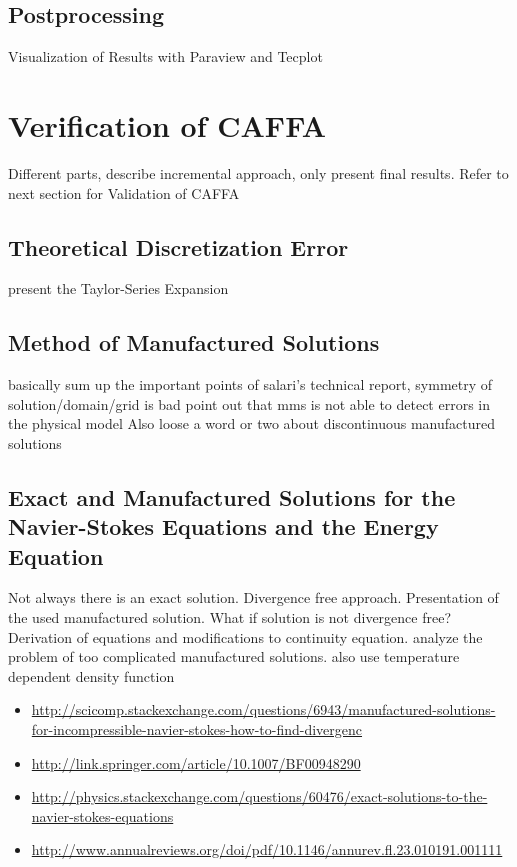 \documentclass[article,type=msc,colorback,accentcolor=tud2a]{tudthesis}
\begin{document}
    \subsection{Postprocessing}
    
      Visualization of Results with Paraview and Tecplot

  \section{Verification of CAFFA}
    
    Different parts, describe incremental approach, only present final results.
    Refer to next section for Validation of CAFFA

    \subsection{Theoretical Discretization Error}
      present the Taylor-Series Expansion

    \subsection{Method of Manufactured Solutions}
      basically sum up the important points of salari's technical report, symmetry of solution/domain/grid is bad
      point out that mms is not able to detect errors in the physical model
      Also loose a word or two about discontinuous manufactured solutions

    \subsection{Exact and Manufactured Solutions for the Navier-Stokes Equations and the Energy Equation}
    Not always there is an exact solution. Divergence free approach. Presentation of the used manufactured solution. What if solution is not divergence free? Derivation of equations and modifications to continuity equation. analyze the problem of too complicated manufactured solutions. also use temperature dependent density function
    \begin{itemize}
      \item \url{http://scicomp.stackexchange.com/questions/6943/manufactured-solutions-for-incompressible-navier-stokes-how-to-find-divergenc}
      \item \url{http://link.springer.com/article/10.1007/BF00948290}
      \item \url{http://physics.stackexchange.com/questions/60476/exact-solutions-to-the-navier-stokes-equations}
      \item \url{http://www.annualreviews.org/doi/pdf/10.1146/annurev.fl.23.010191.001111}
    \end{itemize}
\end{document}
